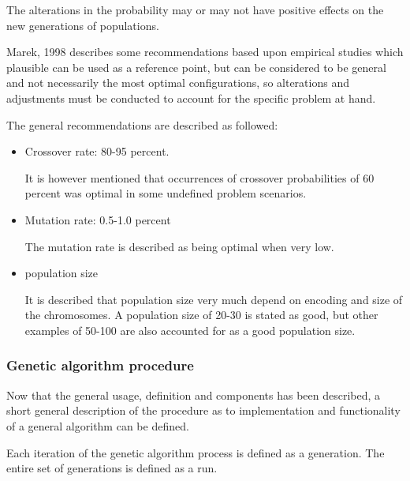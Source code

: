 The alterations in the probability may or may not have positive effects on the new generations of populations.

Marek, 1998\cite{Marek1998}  describes some recommendations based upon empirical studies which plausible can be used as a reference point, but can be considered to be general and not necessarily the most optimal configurations, so alterations and adjustments must be conducted to account for the specific problem at hand.

The general recommendations are described as followed:
\begin{itemize}
\item Crossover rate: 80-95 percent.

It is however mentioned that occurrences of crossover probabilities of 60 percent was optimal in some undefined problem scenarios.
\item Mutation rate: 0.5-1.0 percent

The mutation rate is described as being optimal when very low.
\item population size

It is described that population size very much depend on encoding and size of the chromosomes. A population size of 20-30 is stated as good, but other examples of 50-100 are also accounted for as a good population size.
\end{itemize}

\subsubsection{Genetic algorithm procedure}


Now that the general usage, definition and components has been described, a short general description of the procedure as to implementation and functionality of a general algorithm can be defined.

Each iteration of the genetic algorithm process is defined as a generation. The entire set of generations is defined as a run. \cite[pp. 9]{Melanie1990}





